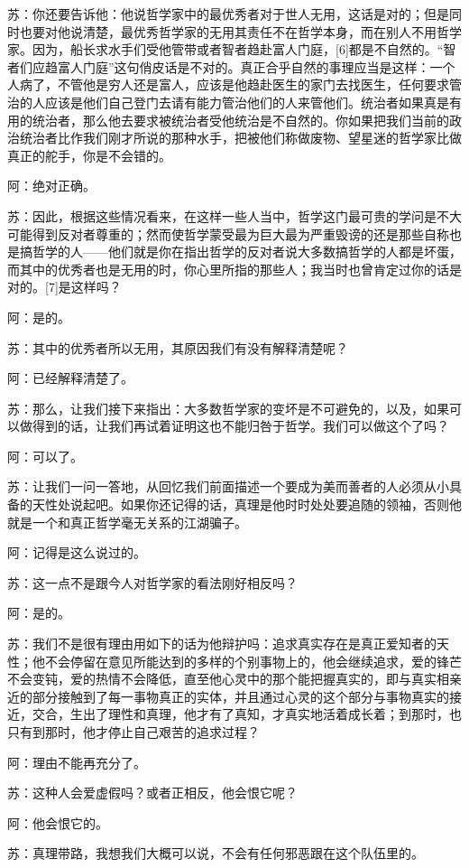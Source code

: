 \documentclass[12pt,oneside]{book}
\begin{document}
苏：你还要告诉他：他说哲学家中的最优秀者对于世人无用，这话是对的；但是同时也要对他说清楚，最优秀哲学家的无用其责任不在哲学本身，而在别人不用哲学家。因为，船长求水手们受他管带或者智者趋赴富人门庭，[6]都是不自然的。“智者们应趋富人门庭”这句俏皮话是不对的。真正合乎自然的事理应当是这样：一个人病了，不管他是穷人还是富人，应该是他趋赴医生的家门去找医生，任何要求管治的人应该是他们自己登门去请有能力管治他们的人来管他们。统治者如果真是有用的统治者，那么他去要求被统治者受他统治是不自然的。你如果把我们当前的政治统治者比作我们刚才所说的那种水手，把被他们称做废物、望星迷的哲学家比做真正的舵手，你是不会错的。

阿：绝对正确。

苏：因此，根据这些情况看来，在这样一些人当中，哲学这门最可贵的学问是不大可能得到反对者尊重的；然而使哲学蒙受最为巨大最为严重毁谤的还是那些自称也是搞哲学的人——他们就是你在指出哲学的反对者说大多数搞哲学的人都是坏蛋，而其中的优秀者也是无用的时，你心里所指的那些人；我当时也曾肯定过你的话是对的。[7]是这样吗？

阿：是的。

苏：其中的优秀者所以无用，其原因我们有没有解释清楚呢？

阿：已经解释清楚了。

苏：那么，让我们接下来指出：大多数哲学家的变坏是不可避免的，以及，如果可以做得到的话，让我们再试着证明这也不能归咎于哲学。我们可以做这个了吗？

阿：可以了。

苏：让我们一问一答地，从回忆我们前面描述一个要成为美而善者的人必须从小具备的天性处说起吧。如果你还记得的话，真理是他时时处处要追随的领袖，否则他就是一个和真正哲学毫无关系的江湖骗子。

阿：记得是这么说过的。

苏：这一点不是跟今人对哲学家的看法刚好相反吗？

阿：是的。

苏：我们不是很有理由用如下的话为他辩护吗：追求真实存在是真正爱知者的天性；他不会停留在意见所能达到的多样的个别事物上的，他会继续追求，爱的锋芒不会变钝，爱的热情不会降低，直至他心灵中的那个能把握真实的，即与真实相亲近的部分接触到了每一事物真正的实体，并且通过心灵的这个部分与事物真实的接近，交合，生出了理性和真理，他才有了真知，才真实地活着成长着；到那时，也只有到那时，他才停止自己艰苦的追求过程？

阿：理由不能再充分了。

苏：这种人会爱虚假吗？或者正相反，他会恨它呢？

阿：他会恨它的。

苏：真理带路，我想我们大概可以说，不会有任何邪恶跟在这个队伍里的。
\end{document}
